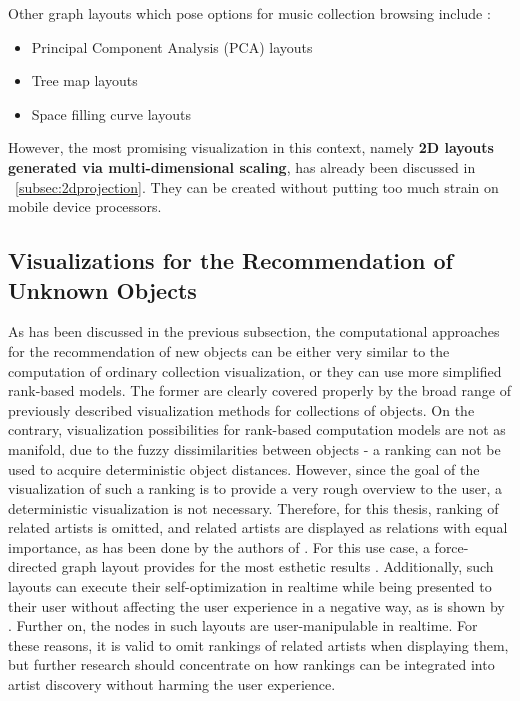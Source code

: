 Other graph layouts which pose options for music collection browsing include \cite{Muelder:2010fk}:

\begin{itemize}
	\item Principal Component Analysis (PCA) layouts 
	\item Tree map layouts 
	\item Space filling curve layouts
\end{itemize}

However, the most promising visualization in this context, namely \textbf{2D layouts generated via multi-dimensional scaling}, has already been discussed in ~\ref{subsec:2dprojection}. They can be created without putting too much strain on mobile device processors.

\subsection{Visualizations for the Recommendation of Unknown Objects}

As has been discussed in the previous subsection, the computational approaches for the recommendation of new objects can be either very similar to the computation of ordinary collection visualization, or they can use more simplified rank-based models. The former are clearly covered properly by the broad range of previously described visualization methods for collections of objects. On the contrary, visualization possibilities for rank-based computation models are not as manifold, due to the fuzzy dissimilarities between objects - a ranking can not be used to acquire deterministic object distances. However, since the goal of the visualization of such a ranking is to provide a very rough overview to the user, a deterministic visualization is not necessary. Therefore, for this thesis, ranking of related artists is omitted, and related artists are displayed as relations with equal importance, as has been done by the authors of \cite{DBLP:conf/webist/SarmentoGCO09}. For this use case, a force-directed graph layout provides for the most esthetic results \cite{DBLP:journals/spe/FruchtermanR91}. Additionally, such layouts can execute their self-optimization in realtime while being presented to their user without affecting the user experience in a negative way, as is shown by \cite{url:tuneglue}. Further on, the nodes in such layouts are user-manipulable in realtime. For these reasons, it is valid to omit rankings of related artists when displaying them, but further research should concentrate on how rankings can be integrated into artist discovery without harming the user experience.

